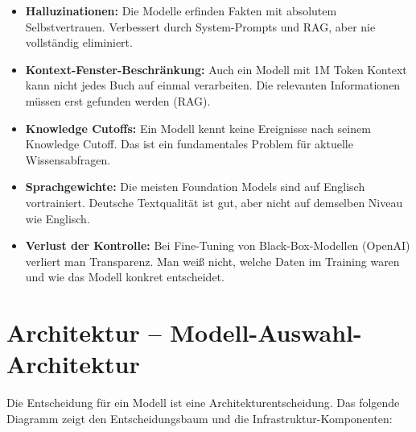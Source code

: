 \begin{itemize}

    \item \textbf{Halluzinationen:} Die Modelle erfinden Fakten mit absolutem Selbstvertrauen. Verbessert durch System-Prompts und RAG, aber nie vollständig eliminiert.

    \item \textbf{Kontext-Fenster-Beschränkung:} Auch ein Modell mit 1M Token Kontext kann nicht jedes Buch auf einmal verarbeiten. Die relevanten Informationen müssen erst gefunden werden (RAG).

    \item \textbf{Knowledge Cutoffs:} Ein Modell kennt keine Ereignisse nach seinem Knowledge Cutoff. Das ist ein fundamentales Problem für aktuelle Wissensabfragen.

    \item \textbf{Sprachgewichte:} Die meisten Foundation Models sind auf Englisch vortrainiert. Deutsche Textqualität ist gut, aber nicht auf demselben Niveau wie Englisch.

    \item \textbf{Verlust der Kontrolle:} Bei Fine-Tuning von Black-Box-Modellen (OpenAI) verliert man Transparenz. Man weiß nicht, welche Daten im Training waren und wie das Modell konkret entscheidet.
\end{itemize}


\section{Architektur -- Modell-Auswahl-Architektur}

Die Entscheidung für ein Modell ist eine Architekturentscheidung. Das folgende Diagramm zeigt den Entscheidungsbaum und die Infrastruktur-Komponenten:

